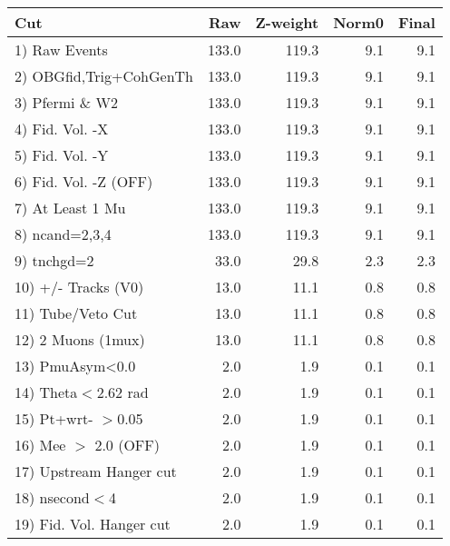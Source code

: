  \begin{table}[h!]\centering
 \begin{tabular}{||l||r|r|r|r||}
 \hline
 \hline
 Cut & Raw & Z-weight & Norm0 & Final \\
 \hline
  1) Raw Events           &       133.0 &       119.3 &         9.1 &         9.1 \\
  2) OBGfid,Trig+CohGenTh &       133.0 &       119.3 &         9.1 &         9.1 \\
  3) Pfermi \& W2         &       133.0 &       119.3 &         9.1 &         9.1 \\
  4) Fid. Vol. -X         &       133.0 &       119.3 &         9.1 &         9.1 \\
  5) Fid. Vol. -Y         &       133.0 &       119.3 &         9.1 &         9.1 \\
  6) Fid. Vol. -Z (OFF)   &       133.0 &       119.3 &         9.1 &         9.1 \\
  7) At Least 1 Mu        &       133.0 &       119.3 &         9.1 &         9.1 \\
  8) ncand=2,3,4          &       133.0 &       119.3 &         9.1 &         9.1 \\
  9) tnchgd=2             &        33.0 &        29.8 &         2.3 &         2.3 \\
 10) +/- Tracks (V0)      &        13.0 &        11.1 &         0.8 &         0.8 \\
 11) Tube/Veto Cut        &        13.0 &        11.1 &         0.8 &         0.8 \\
 12) 2 Muons (1mux)       &        13.0 &        11.1 &         0.8 &         0.8 \\
 13) PmuAsym<0.0          &         2.0 &         1.9 &         0.1 &         0.1 \\
 14) Theta$<$2.62 rad     &         2.0 &         1.9 &         0.1 &         0.1 \\
 15) Pt+wrt- $>$0.05      &         2.0 &         1.9 &         0.1 &         0.1 \\
 16) Mee $>$ 2.0  (OFF)   &         2.0 &         1.9 &         0.1 &         0.1 \\
 17) Upstream Hanger cut  &         2.0 &         1.9 &         0.1 &         0.1 \\
 18) nsecond$<$4          &         2.0 &         1.9 &         0.1 &         0.1 \\
 19) Fid. Vol. Hanger cut &         2.0 &         1.9 &         0.1 &         0.1 \\

\end{tabular}
\end{table}
